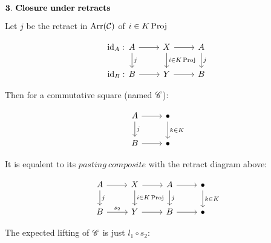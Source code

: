 \begin{prf}
        \par $\mbf{3.\ Closure\ under\ retracts}$\\

            \par Let $j$ be the retract in $\operatorname{\rm{Arr}}(\mathcal{C})$  of $i \in K \operatorname{\rm{Proj}}$

            \[\begin{tikzcd}
                A & X & A \\
                B & Y & B
                \arrow["{i\in K \Proj}", from=1-2, to=2-2]
                \arrow[from=1-2, to=1-3]
                \arrow[from=2-2, to=2-3]
                \arrow["\id_A : \hspace*{2.77cm}"{marking}, from=1-1, to=1-2]
                \arrow["\id_B : \hspace*{2.77cm}"{marking}, from=2-1, to=2-2]
                \arrow["j", from=1-1, to=2-1]
                \arrow["j", from=1-3, to=2-3]
            \end{tikzcd}\]

            Then for a commutative square (named $\mathscr{C}$):

            \[\begin{tikzcd}
                A & \bullet \\
                B & \bullet
                \arrow["{k\in K}", from=1-2, to=2-2]
                \arrow[from=1-1, to=1-2]
                \arrow[from=2-1, to=2-2]
                \arrow["j", from=1-1, to=2-1]
            \end{tikzcd}\]

            It is equalent to its $pasting\ composite$ with the retract diagram above:

            \[\begin{tikzcd}
                A & X & A & \bullet \\
                B & Y & B & \bullet
                \arrow["{k\in K}", from=1-4, to=2-4]
                \arrow[from=1-3, to=1-4]
                \arrow[from=2-3, to=2-4]
                \arrow["j", from=1-3, to=2-3]
                \arrow[from=1-2, to=1-3]
                \arrow[from=2-2, to=2-3]
                \arrow["{i \in K \Proj}", from=1-2, to=2-2]
                \arrow[from=1-1, to=1-2]
                \arrow["j", from=1-1, to=2-1]
                \arrow["s_2",from=2-1, to=2-2]
            \end{tikzcd}\]

            The expected lifting of $\mathscr{C}$ is just $l_1 \circ s_2$:


\end{prf}
